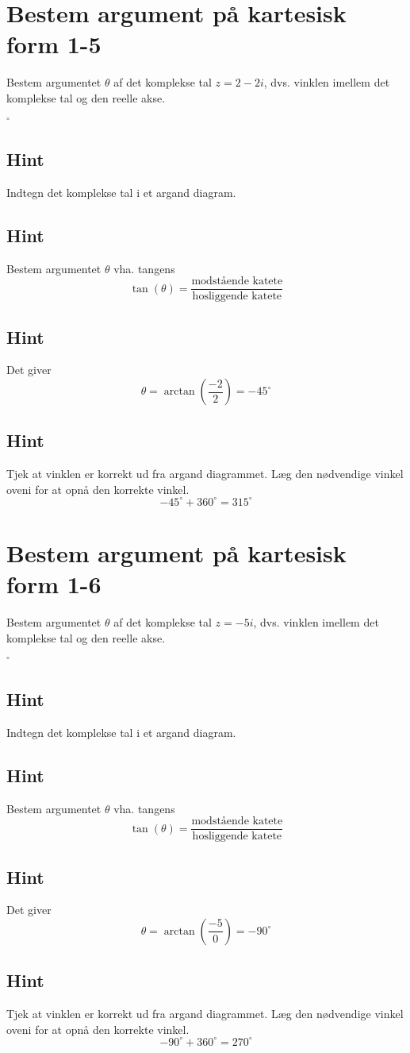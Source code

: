 \documentclass{article}
\newenvironment{exercise}[1]{\newpage\section{#1}}{}
\newcommand{\answerbox}[1]{\fbox{$#1$}}
\newcommand{\hint}{\subsection*{Hint}}
\begin{document}
\begin{exercise}{Bestem argument på kartesisk form 1-5}
	
	Bestem argumentet $\theta$ af det komplekse tal $z=2-2i$, dvs. vinklen imellem det komplekse tal og den reelle akse.
	
	\answerbox{315^\circ}$^\circ$
	
	
	\hint 
	
	Indtegn det komplekse tal i et argand diagram.
	
	
	\hint
	
	Bestem argumentet $\theta$ vha. tangens
	\[
	\tan(\theta)=\frac{\textrm{modstående katete}}{\textrm{hosliggende katete}}
	\]
	
	\hint 
	
	Det giver
	\[
	\theta = \arctan \left(\frac{-2}{2}\right) =-45^\circ
	\]
	
	\hint
	
	Tjek at vinklen er korrekt ud fra argand diagrammet. Læg den nødvendige vinkel oveni for at opnå den korrekte vinkel. 
	\[
	-45^\circ + 360^\circ = 315^\circ
	\]
	
\end{exercise}

\newpage

\begin{exercise}{Bestem argument på kartesisk form 1-6}
	
	Bestem argumentet $\theta$ af det komplekse tal $z=-5i$, dvs. vinklen imellem det komplekse tal og den reelle akse.
	
	\answerbox{270}$^\circ$
	
	
	\hint 
	
	Indtegn det komplekse tal i et argand diagram.
	
	
	\hint
	
	Bestem argumentet $\theta$ vha. tangens
	\[
	\tan(\theta)=\frac{\textrm{modstående katete}}{\textrm{hosliggende katete}}
	\]
	
	\hint 
	
	Det giver
	\[
	\theta = \arctan \left(\frac{-5}{0}\right) = -90^\circ
	\]
	
	\hint
	
	Tjek at vinklen er korrekt ud fra argand diagrammet. Læg den nødvendige vinkel oveni for at opnå den korrekte vinkel. 
	\[
	-90^\circ + 360^\circ  = 270^\circ 
	\]
	
	
\end{exercise}

\newpage
\end{document}
